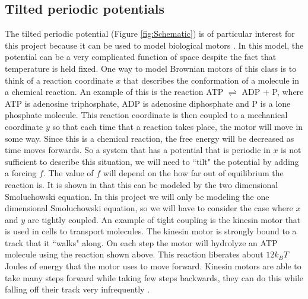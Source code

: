 \subsection{Tilted periodic potentials}
The tilted periodic potential (Figure \ref{fig:Schematic}) is of particular interest for this project because it can be used to model biological motors \cite{Leibler1993,Magnasco1994}. In this model, the potential can be a very complicated function of space despite the fact that temperature is held fixed. One way to model Brownian motors of this class is to think of a reaction coordinate $x$ that describes the conformation of a molecule in a chemical reaction. An example of this is the reaction ATP $\rightleftharpoons$ ADP + P, where ATP is adenosine triphosphate, ADP is adenosine diphosphate and P is a lone phosphate molecule. This reaction coordinate is then coupled to a mechanical coordinate $y$ so that each time that a reaction takes place, the motor will move in some way. Since this is a chemical reaction, the free energy will be decreased as time moves forwards. So a system that has a potential that is periodic in $x$ is not sufficient to describe this situation, we will need to ``tilt" the potential by adding a forcing $f$. The value of $f$ will depend on the how far out of equilibrium the reaction is. It is shown in \cite{Magnasco1994} that this can be modeled by the two dimensional Smoluchowski equation. In this project we will only be modeling the one dimensional Smoluchowski equation, so we will have to consider the case where $x$ and $y$ are tightly coupled. An example of tight coupling is the kinesin motor \cite{Leibler1993} that is used in cells to transport molecules. The kinesin motor is strongly bound to a track that it ``walks" along. On each step the motor will hydrolyze an ATP molecule using the reaction shown above. This reaction liberates about $12 k_B T$ Joules of energy that the motor uses to move forward. Kinesin motors are able to take many steps forward while taking few steps backwards, they can do this while falling off their track very infrequently \cite{BlockSM1990}.
